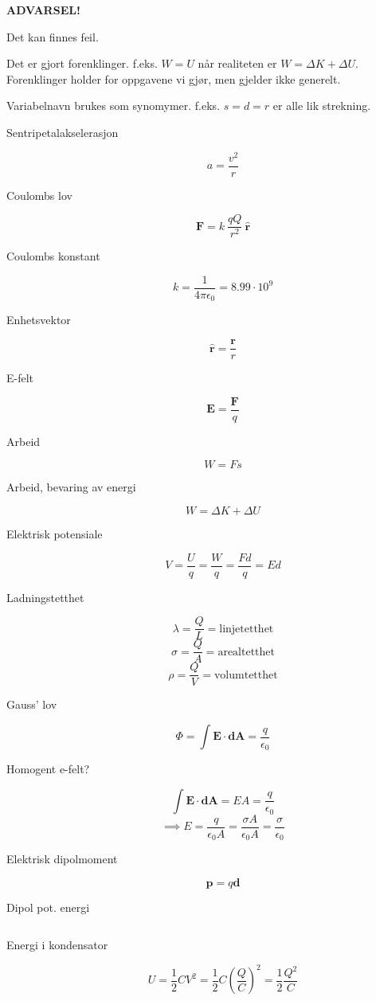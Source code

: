 \textbf{ADVARSEL!}

Det kan finnes feil.

Det er gjort forenklinger.
f.eks. $W = U$ når realiteten er $W = \Delta K + \Delta U$.
Forenklinger holder for oppgavene vi gjør, men gjelder ikke generelt.

Variabelnavn brukes som synomymer.
f.eks. $s = d = r$ er alle lik strekning.

\begin{description}
  \item [Sentripetalakselerasjon] $$a = \frac{v^2}{r}$$
  \item [Coulombs lov] $$\mathbf{F} = k\ \frac{qQ}{r^2}\ \mathbf{\hat{r}}$$
  \item [Coulombs konstant] $$k = \frac{1}{4\pi\epsilon_0} = 8.99\cdot 10^9$$
  \item [Enhetsvektor] $$\mathbf{\hat{r}} = \frac{\mathbf{r}}{r}$$
  \item [E-felt] $$\mathbf{E} = \frac{\mathbf{F}}{q}$$
  \item [Arbeid] $$W = Fs$$
  \item [Arbeid, bevaring av energi] $$W = \Delta K + \Delta U$$
  \item [Elektrisk potensiale] $$V = \frac{U}{q} = \frac{W}{q}
                               = \frac{Fd}{q} = Ed$$
  \item [Ladningstetthet] $$\lambda = \frac{Q}{L} = \text{linjetetthet}$$
                          $$\sigma = \frac{Q}{A} = \text{arealtetthet}$$
                          $$\rho = \frac{Q}{V} = \text{volumtetthet}$$
  \item [Gauss' lov] $$\Phi = \int\mathbf{E}\cdot\mathbf{dA}
                     = \frac{q}{\epsilon_0}$$
  \item [Homogent e-felt?] $$\int\mathbf{E}\cdot\mathbf{dA}
                           = EA = \frac{q}{\epsilon_0}$$
                           $$\implies E = \frac{q}{\epsilon_0 A}
                           = \frac{\sigma A}{\epsilon_0 A}
                           = \frac{\sigma}{\epsilon_0}$$
  \item [Elektrisk dipolmoment] $$\mathbf{p} = q \mathbf{d}$$
  \item [Dipol pot. energi] $$$$
  \item [Energi i kondensator]
         $$U = \frac{1}{2}CV^2
         = \frac{1}{2}C\left(\frac{Q}{C}\right)^2
         = \frac{1}{2}\frac{Q^2}{C}$$
  \item [] $$$$
\end{description}
